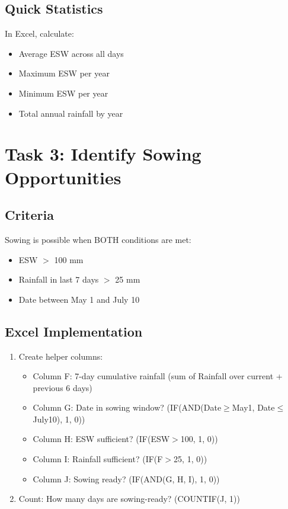 \subsection{Quick Statistics}

In Excel, calculate:
\begin{itemize}
  \item Average ESW across all days
  \item Maximum ESW per year
  \item Minimum ESW per year
  \item Total annual rainfall by year
\end{itemize}

\section{Task 3: Identify Sowing Opportunities}

\subsection{Criteria}

Sowing is possible when BOTH conditions are met:
\begin{itemize}
  \item ESW $>$ 100 mm
  \item Rainfall in last 7 days $>$ 25 mm
  \item Date between May 1 and July 10
\end{itemize}

\subsection{Excel Implementation}

\begin{enumerate}
  \item Create helper columns:
    \begin{itemize}
      \item Column F: 7-day cumulative rainfall (sum of Rainfall over current + previous 6 days)
      \item Column G: Date in sowing window? (IF(AND(Date$\geq$May1, Date$\leq$July10), 1, 0))
      \item Column H: ESW sufficient? (IF(ESW$>$100, 1, 0))
      \item Column I: Rainfall sufficient? (IF(F$>$25, 1, 0))
      \item Column J: Sowing ready? (IF(AND(G, H, I), 1, 0))
    \end{itemize}
  
  \item Count: How many days are sowing-ready? (COUNTIF(J, 1))
\end{enumerate}

